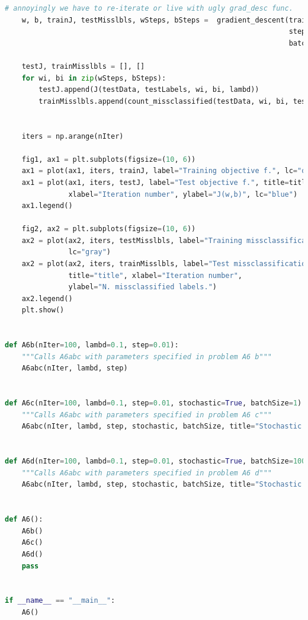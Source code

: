 \documentclass{article}
\newcommand{\1}{\mathbf{1}}
\begin{document}
\begin{lstlisting}[language=Python]
    # annoyingly we have to re-iterate or live with ugly grad_desc func.
    w, b, trainJ, testMisslbls, wSteps, bSteps =  gradient_descent(trainData, trainLabels, lambd,
                                                                   step, nIter=nIter, stochastic=stochastic,
                                                                   batchSize=batchSize)

    testJ, trainMisslbls = [], []
    for wi, bi in zip(wSteps, bSteps):
        testJ.append(J(testData, testLabels, wi, bi, lambd))
        trainMisslbls.append(count_missclassified(testData, wi, bi, testLabels))


    iters = np.arange(nIter)

    fig1, ax1 = plt.subplots(figsize=(10, 6))
    ax1 = plot(ax1, iters, trainJ, label="Training objective f.", lc="orange")
    ax1 = plot(ax1, iters, testJ, label="Test objective f.", title=title,
               xlabel="Iteration number", ylabel="J(w,b)", lc="blue")
    ax1.legend()

    fig2, ax2 = plt.subplots(figsize=(10, 6))
    ax2 = plot(ax2, iters, testMisslbls, label="Training missclassifications.",
               lc="gray")
    ax2 = plot(ax2, iters, trainMisslbls, label="Test missclassifications.",
               title="title", xlabel="Iteration number",
               ylabel="N. missclassified labels.")
    ax2.legend()
    plt.show()


def A6b(nIter=100, lambd=0.1, step=0.01):
    """Calls A6abc with parameters specified in problem A6 b"""
    A6abc(nIter, lambd, step)


def A6c(nIter=100, lambd=0.1, step=0.01, stochastic=True, batchSize=1):
    """Calls A6abc with parameters specified in problem A6 c"""
    A6abc(nIter, lambd, step, stochastic, batchSize, title="Stochastic Gradient Descent.")


def A6d(nIter=100, lambd=0.1, step=0.01, stochastic=True, batchSize=100):
    """Calls A6abc with parameters specified in problem A6 d"""
    A6abc(nIter, lambd, step, stochastic, batchSize, title="Stochastic Gradient Descent.")


def A6():
    A6b()
    A6c()
    A6d()
    pass
    
    
if __name__ == "__main__":
    A6()

\end{lstlisting}
\end{document}
